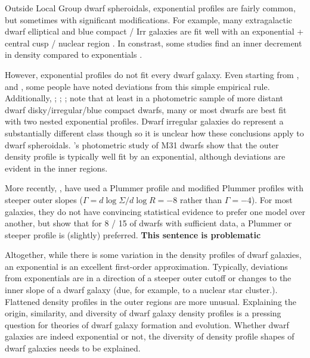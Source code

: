 Outside Local Group dwarf spheroidals, exponential profiles are fairly
common, but sometimes with significant modifications. For example, many
extragalactic dwarf elliptical and blue compact / Irr galaxies are fit
well with an exponential + central cusp / nuclear region
\citep[\citet{noeske+2003}]{caldwell+bothun1987}. In constrast, some
studies find an inner decrement in density compared to exponentials
\citep[e.g.,][]{caldwell+1992, makarov+2012}.

However, exponential profiles do not fit every dwarf galaxy. Even
starting from \citet{aparicio+1997}, and \citet[for Coma cluster dwarf
ellipticals]{graham+guzman2003}, some people have noted deviations from
this simple empirical rule. Additionally, \citet{hunter+elmegreen2006};
\citet{herrmann+hunter+elmegreen2013};
\citet{herrmann+hunter+elmegreen2016}; \citet{lee+2018} note that at
least in a photometric sample of more distant dwarf disky/irregular/blue
compact dwarfs, many or most dwarfs are best fit with two nested
exponential profiles. Dwarf irregular galaxies do represent a
substantially different class though so it is unclear how these
conclusions apply to dwarf spheroidals. \citet{caldwell+1992}'s
photometric study of M31 dwarfs show that the outer density profile is
typically well fit by an exponential, although deviations are evident in
the inner regions.

More recently, \citet{moskowitz+walker2020}, have used a Plummer profile
and modified Plummer profiles with steeper outer slopes
(\(\Gamma = d\log \Sigma / d \log R = -8\) rather than \(\Gamma = -4\)).
For most galaxies, they do not have convincing statistical evidence to
prefer one model over another, but show that for 8 / 15 of dwarfs with
sufficient data, a Plummer or steeper profile is (slightly) preferred.
\textbf{This sentence is problematic}

Altogether, while there is some variation in the density profiles of
dwarf galaxies, an exponential is an excellent first-order
approximation. Typically, deviations from exponentials are in a
direction of a steeper outer cutoff or changes to the inner slope of a
dwarf galaxy (due, for example, to a nuclear star cluster.). Flattened
density profiles in the outer regions are more unusual. Explaining the
origin, similarity, and diversity of dwarf galaxy density profiles is a
pressing question for theories of dwarf galaxy formation and evolution.
Whether dwarf galaxies are indeed exponential or not, the diversity of
density profile shapes of dwarf galaxies needs to be explained.

